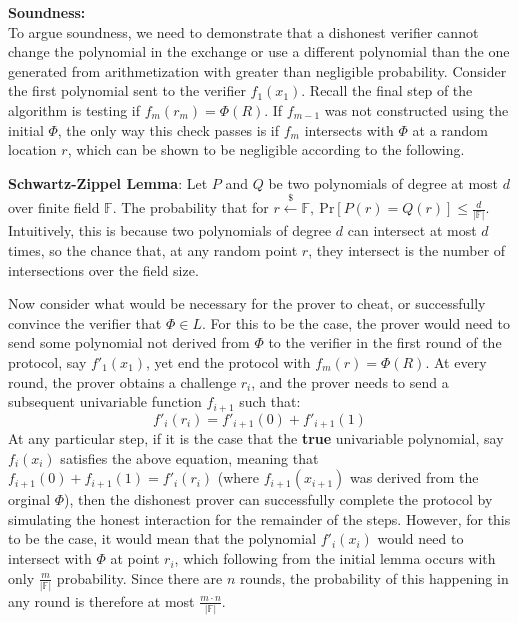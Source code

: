 \documentclass[11pt]{article}
\begin{document}
\textbf{Soundness:}\\To argue soundness, we need to demonstrate that a dishonest verifier cannot change the polynomial in the exchange or use a different polynomial than the one generated from arithmetization with greater than negligible probability. Consider the first polynomial sent to the verifier $f_1(x_1)$. Recall the final step of the algorithm is testing if $f_{m}(r_m) = \Phi(R)$. If $f_{m-1}$ was not constructed using the initial $\Phi$, the only way this check passes is if $f_{m}$ intersects with $\Phi$ at a random location $r$, which can be shown to be negligible according to the following.
\vspace{1em}

\textbf{Schwartz-Zippel Lemma}: Let $P$ and $Q$ be two polynomials of degree at most $d$ over finite field $\mathbb{F}$. The probability that for $r \overset{\$}\leftarrow \mathbb{F},\  \text{Pr}[P(r) = Q(r)] \leq \frac{d}{\lvert \mathbb{F} \rvert}$. Intuitively, this is because two polynomials of degree $d$ can intersect at most $d$ times, so the chance that, at any random point $r$, they intersect is the number of intersections over the field size.
\vspace{1em}

Now consider what would be necessary for the prover to cheat, or successfully convince the verifier that $\Phi \in L$. For this to be the case, the prover would need to send some polynomial not derived from $\Phi$ to the verifier in the first round of the protocol, say $f'_1(x_1)$, yet end the protocol with $f_m(r) = \Phi(R)$. At every round, the prover obtains a challenge $r_i$, and the prover needs to send a subsequent univariable function $f_{i+1}$ such that: $$f'_i(r_i) = f'_{i+1}(0) + f'_{i+1}(1)$$At any particular step, if it is the case that the \textbf{true} univariable polynomial, say $f_i(x_i)$ satisfies the above equation, meaning that $f_{i+1}(0) + f_{i+1}(1) = f'_i(r_i)$ (where $f_{i+1}(x_{i+1})$ was derived from the orginal $\Phi$), then the dishonest prover can successfully complete the protocol by simulating the honest interaction for the remainder of the steps. However, for this to be the case, it would mean that the polynomial $f'_i(x_i)$ would need to intersect with $\Phi$ at point $r_i$, which following from the initial lemma occurs with only $\frac{m}{\lvert \mathbb{F} \rvert}$ probability. Since there are $n$ rounds, the probability of this happening in any round is therefore at most $\frac{m\cdot n}{\lvert \mathbb{F} \rvert}$.
\end{document}
